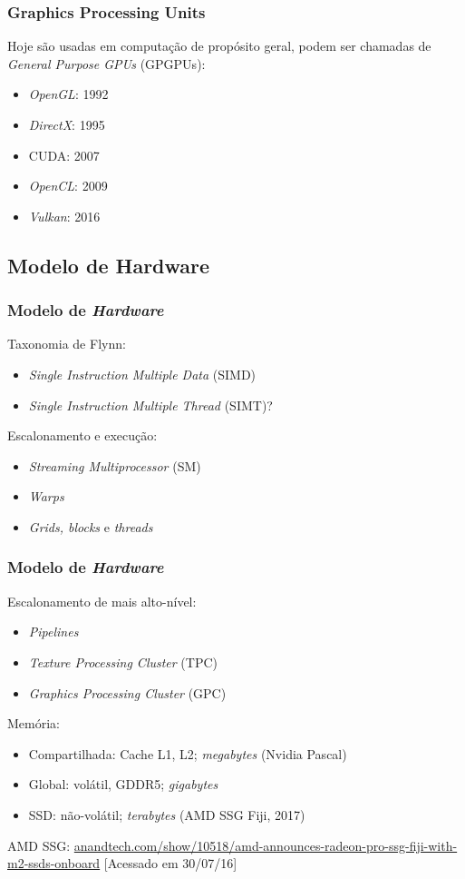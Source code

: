 \documentclass[10pt, compress]{beamer}
\begin{document}
\begin{frame}
    \frametitle{Graphics Processing Units}
    Hoje são usadas em computação de propósito geral, podem ser chamadas de
    \textit{General Purpose GPUs} (GPGPUs):
    \pause
    \begin{itemize}
        \item \textit{OpenGL}: 1992
        \item \textit{DirectX}: 1995
        \item \alert{CUDA}: 2007
        \item \textit{OpenCL}: 2009
        \item \textit{Vulkan}: 2016
    \end{itemize}
\end{frame}

\subsection{Modelo de Hardware}

\begin{frame}
    \frametitle{Modelo de \textit{Hardware}}
    Taxonomia de Flynn:
    \begin{itemize}
        \item \textit{Single Instruction Multiple Data} (SIMD)
            \pause
        \item \textit{Single Instruction Multiple Thread} (SIMT)?
    \end{itemize}
    \pause
    Escalonamento e execução:
    \begin{itemize}
        \item \textit{Streaming Multiprocessor} (SM)
            \pause
        \item \textit{Warps}
            \pause
        \item \textit{Grids, blocks} e \textit{threads}
    \end{itemize}
\end{frame}

\begin{frame}
    \frametitle{Modelo de \textit{Hardware}}
    Escalonamento de mais alto-nível:
    \begin{itemize}
        \item \textit{Pipelines}
        \item \textit{Texture Processing Cluster} (TPC)
        \item \textit{Graphics Processing Cluster} (GPC)
    \end{itemize}
    \pause
    Memória:
    \begin{itemize}
        \item Compartilhada: Cache L1, L2; \textit{megabytes} (Nvidia Pascal)
        \item Global: volátil, GDDR5; \textit{gigabytes}
            \pause
        \item SSD: \alert{não-volátil}; \alert{\textit{terabytes}} (AMD SSG Fiji, 2017)
    \end{itemize}
    \vfill

    \tiny{AMD SSG: \url{anandtech.com/show/10518/amd-announces-radeon-pro-ssg-fiji-with-m2-ssds-onboard} [Acessado em 30/07/16]}
\end{frame}
\end{document}
